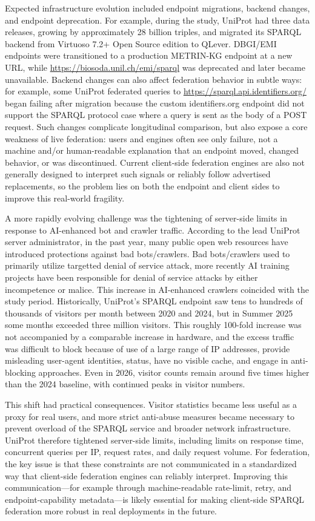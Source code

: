 \documentclass[runningheads]{llncs}
\begin{document}
Expected infrastructure evolution included endpoint migrations, backend changes, and endpoint deprecation. 
For example, during the study, UniProt had three data releases, growing by approximately 28 billion triples, and migrated its SPARQL backend from Virtuoso 7.2+ Open Source edition to QLever. 
DBGI/EMI endpoints were transitioned to a production METRIN-KG endpoint at a new URL, while \url{https://biosoda.unil.ch/emi/sparql} was deprecated and later became unavailable. 
Backend changes can also affect federation behavior in subtle ways: for example, some UniProt federated queries to \url{https://sparql.api.identifiers.org/} began failing after migration because the custom identifiers.org endpoint did not support the SPARQL protocol case where a query is sent as the body of a POST request. 
Such changes complicate longitudinal comparison, but also expose a core weakness of live federation: users and engines often see only failure, not a machine and/or human-readable explanation that an endpoint moved, changed behavior, or was discontinued. 
Current client-side federation engines are also not generally designed to interpret such signals or reliably follow advertised replacements, so the problem lies on both the endpoint and client sides to improve this real-world fragility.

A more rapidly evolving challenge was the tightening of server-side limits in response to AI-enhanced bot and crawler traffic. 
According to the lead UniProt server administrator, in the past year, many public open web resources have introduced protections against bad bots/crawlers. 
Bad bots/crawlers used to primarily utilize targetted denial of service attack, more recently AI training projects have been responsible for denial of service attacks by either incompetence or malice.
This increase in AI-enhanced crawlers coincided with the study period.
Historically, UniProt's SPARQL endpoint saw tens to hundreds of thousands of visitors per month between 2020 and 2024, but in Summer 2025 some months exceeded three million visitors. 
This roughly 100-fold increase was not accompanied by a comparable increase in hardware, and the excess traffic was difficult to block because of use of a large range of IP addresses, provide misleading user-agent identities, status, have no visible cache, and engage in anti-blocking approaches. 
Even in 2026, visitor counts remain around five times higher than the 2024 baseline, with continued peaks in visitor numbers.

This shift had practical consequences. 
Visitor statistics became less useful as a proxy for real users, and more strict anti-abuse measures became necessary to prevent overload of the SPARQL service and broader network infrastructure. 
UniProt therefore tightened server-side limits, including limits on response time, concurrent queries per IP, request rates, and daily request volume. 
For federation, the key issue is that these constraints are not communicated in a standardized way that client-side federation engines can reliably interpret. 
Improving this communication---for example through machine-readable rate-limit, retry, and endpoint-capability metadata---is likely essential for making client-side SPARQL federation more robust in real deployments in the future.
\end{document}
